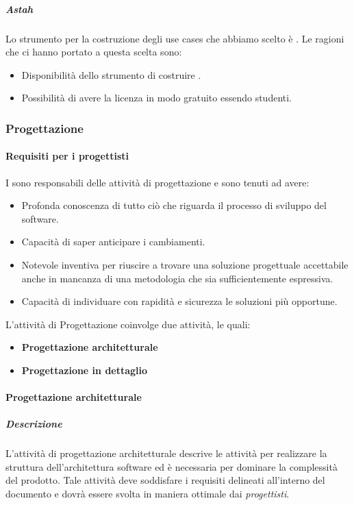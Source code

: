 \subparagraph{Astah}
Lo strumento per la costruzione degli use cases che abbiamo scelto è .
Le ragioni che ci hanno portato a questa scelta sono:
\begin{itemize}
\item Disponibilità dello strumento di costruire .
\item Possibilità di avere la licenza in modo gratuito essendo studenti.
\end{itemize}



\subsubsection{Progettazione}

\paragraph{Requisiti per i progettisti}
I \textit{\ProgP} sono responsabili delle attività di progettazione e sono tenuti ad avere:
\begin{itemize}
\item
Profonda conoscenza di tutto ciò che riguarda il processo di sviluppo del software.
\item
Capacità di saper anticipare i cambiamenti.
\item
Notevole inventiva per riuscire a trovare una soluzione progettuale accettabile anche in mancanza di una metodologia che sia sufficientemente espressiva.
\item
Capacità di individuare con rapidità e sicurezza le soluzioni più opportune.
\end{itemize}

L'attività di Progettazione coinvolge due attività, le quali:
\begin{itemize}
\item \textbf{Progettazione architetturale}
\item \textbf{Progettazione in dettaglio}
\end{itemize}

\paragraph{Progettazione architetturale}
\subparagraph{Descrizione}
L'attività di progettazione architetturale descrive le attività per realizzare la struttura dell'architettura software ed è necessaria per dominare la complessità del prodotto. Tale attività deve soddisfare i requisiti delineati all'interno del documento \AdR{} e dovrà essere svolta in maniera ottimale dai \textit{progettisti}.

